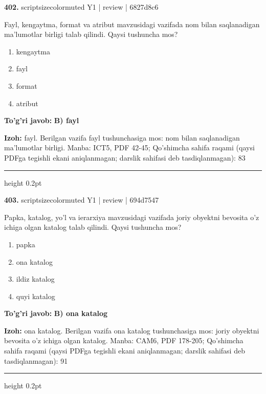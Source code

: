 \documentclass[10pt,a4paper]{article}
\begin{document}
{\bfseries\sffamily\color{ink} 402.} {scriptsizecolor{muted} Y1 | review | 6827d8c6}
\par
Fayl, kengaytma, format va atribut mavzusidagi vazifada nom bilan saqlanadigan ma'lumotlar birligi talab qilindi. Qaysi tushuncha mos?
\begin{enumerate}[label=\Alph*),leftmargin=9mm]
\item kengaytma
\item fayl
\item format
\item atribut
\end{enumerate}
\begin{tcolorbox}[enhanced,breakable,colback=teal!4,colframe=teal!60!black,boxrule=0.45pt,arc=1.2mm,left=2.7mm,right=2.7mm,top=1.8mm,bottom=1.8mm,before skip=2mm,after skip=2mm]
{\bfseries\sffamily\color{teal}To'g'ri javob:} \textbf{B) fayl}
\par\smallskip
{\bfseries Izoh:} fayl. Berilgan vazifa fayl tushunchasiga mos: nom bilan saqlanadigan ma'lumotlar birligi. Manba: ICT5, PDF 42-45; Qo'shimcha sahifa raqami (qaysi PDFga tegishli ekani aniqlanmagan; darslik sahifasi deb tasdiqlanmagan): 83
\end{tcolorbox}
\vspace{2mm}\hrule height 0.2pt\vspace{3mm}

{\bfseries\sffamily\color{ink} 403.} {scriptsizecolor{muted} Y1 | review | 694d7547}
\par
Papka, katalog, yo'l va ierarxiya mavzusidagi vazifada joriy obyektni bevosita o'z ichiga olgan katalog talab qilindi. Qaysi tushuncha mos?
\begin{enumerate}[label=\Alph*),leftmargin=9mm]
\item papka
\item ona katalog
\item ildiz katalog
\item quyi katalog
\end{enumerate}
\begin{tcolorbox}[enhanced,breakable,colback=teal!4,colframe=teal!60!black,boxrule=0.45pt,arc=1.2mm,left=2.7mm,right=2.7mm,top=1.8mm,bottom=1.8mm,before skip=2mm,after skip=2mm]
{\bfseries\sffamily\color{teal}To'g'ri javob:} \textbf{B) ona katalog}
\par\smallskip
{\bfseries Izoh:} ona katalog. Berilgan vazifa ona katalog tushunchasiga mos: joriy obyektni bevosita o'z ichiga olgan katalog. Manba: CAM6, PDF 178-205; Qo'shimcha sahifa raqami (qaysi PDFga tegishli ekani aniqlanmagan; darslik sahifasi deb tasdiqlanmagan): 91
\end{tcolorbox}
\vspace{2mm}\hrule height 0.2pt\vspace{3mm}
\end{document}
